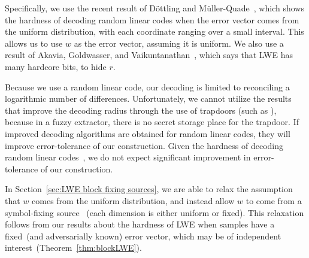 \documentclass[11pt]{article}
\newcommand{\secref}[1]{\mbox{Section~\ref{#1}}}
\newcommand{\thref}[1]{\mbox{Theorem~\ref{#1}}}
\newcommand{\authnote}[2]{{\textcolor{red}{\textsf{#1 notes: }\textcolor{blue}{ #2}}\marginpar{\textcolor{red}{\textbf{!!!!!}}}}}
\newcommand{\authnote}[2]{}
\newcommand{\lnote}[1]{{\authnote{Leo}{#1}}}
\begin{document}
Specifically,  we use the  recent result of D\"{o}ttling and M\"{u}ller-Quade~\cite{dottling2012}, which shows the hardness of decoding random linear codes when the error vector comes from the uniform distribution, with each coordinate ranging over a small interval. This allows us to use $w$ as the error vector, assuming it is uniform.  We also use a result of Akavia, Goldwasser, and Vaikuntanathan~\cite{akavia2009},  which says that LWE has many hardcore bits, to hide $r$.

Because we use a random linear code,  our decoding is limited to reconciling a logarithmic number of differences.  Unfortunately, we  cannot utilize the results that improve the decoding radius through the use of trapdoors (such as \cite{regev2005LWE}), because in a fuzzy extractor, there is no secret storage place for the trapdoor. If improved decoding algorithms are obtained for random linear codes, they will improve error-tolerance of our construction.  Given the hardness of decoding random linear codes~\cite{berlekamp1978}, we do not expect significant improvement in error-tolerance of our construction.


In \secref{sec:LWE block fixing sources}, we are able to relax the assumption that $w$ comes from the uniform distribution, and instead allow $w$ to come from a symbol-fixing source~\cite{KZ07} (each dimension is either uniform or fixed). This relaxation follows from our results about the hardness of LWE when samples have a fixed~(and adversarially known) error vector, which may be of independent interest~(\thref{thm:blockLWE}). 
\end{document}
